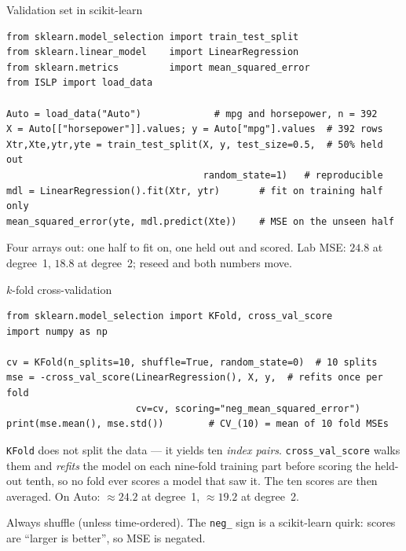 \documentclass[aspectratio=169,11pt]{beamer}
\begin{document}
\begin{frame}[fragile]{Validation set in scikit-learn}
  \begin{lstlisting}
from sklearn.model_selection import train_test_split
from sklearn.linear_model    import LinearRegression
from sklearn.metrics         import mean_squared_error
from ISLP import load_data

Auto = load_data("Auto")             # mpg and horsepower, n = 392
X = Auto[["horsepower"]].values; y = Auto["mpg"].values  # 392 rows
Xtr,Xte,ytr,yte = train_test_split(X, y, test_size=0.5,  # 50% held out
                                   random_state=1)   # reproducible
mdl = LinearRegression().fit(Xtr, ytr)       # fit on training half only
mean_squared_error(yte, mdl.predict(Xte))    # MSE on the unseen half
  \end{lstlisting}
  \begin{readme}
    Four arrays out: one half to fit on, one held out and scored. Lab MSE:
    $24.8$ at degree~1, $18.8$ at degree~2; reseed and both numbers move.
  \end{readme}
\end{frame}

\begin{frame}[fragile]{$k$-fold cross-validation}
  \begin{lstlisting}
from sklearn.model_selection import KFold, cross_val_score
import numpy as np

cv = KFold(n_splits=10, shuffle=True, random_state=0)  # 10 splits
mse = -cross_val_score(LinearRegression(), X, y,  # refits once per fold
                       cv=cv, scoring="neg_mean_squared_error")
print(mse.mean(), mse.std())        # CV_(10) = mean of 10 fold MSEs
  \end{lstlisting}
  \begin{readme}
    \texttt{KFold} does not split the data --- it yields ten
    \emph{index pairs}. \texttt{cross\_val\_score} walks them and
    \emph{refits} the model on each nine-fold training part before scoring
    the held-out tenth, so no fold ever scores a model that saw it. The ten
    scores are then averaged. On Auto: $\approx 24.2$ at degree~1,
    $\approx 19.2$ at degree~2.
  \end{readme}
  Always shuffle (unless time-ordered). The \texttt{neg\_} sign is a
  scikit-learn quirk: scores are ``larger is better'', so MSE is negated.
\end{frame}
\end{document}
